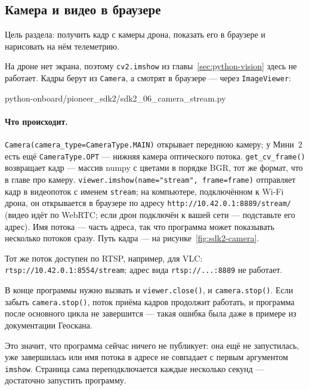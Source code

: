 \subsection{Камера и видео в браузере}

Цель раздела: получить кадр с камеры дрона, показать его в браузере и нарисовать на нём телеметрию.

На дроне нет экрана, поэтому \verb|cv2.imshow| из главы~\ref{sec:python-vision} здесь не работает. Кадры берут из \verb|Camera|, а смотрят в браузере --- через \verb|ImageViewer|:

\begin{codefile}[python]{python-onboard/pioneer_sdk2/sdk2_06_camera_stream.py}
\end{codefile}

\paragraph{Что происходит.} \verb|Camera(camera_type=CameraType.MAIN)| открывает переднюю камеру; у Мини~2 есть ещё \verb|CameraType.OPT| --- нижняя камера оптического потока. \verb|get_cv_frame()| возвращает кадр --- массив numpy с цветами в порядке BGR, тот же формат, что в главе про камеру. \verb|viewer.imshow(name="stream", frame=frame)| отправляет кадр в видеопоток с именем \texttt{stream}; на компьютере, подключённом к Wi-Fi дрона, он открывается в браузере по адресу \texttt{http://10.42.0.1:8889/stream/} (видео идёт по WebRTC; если дрон подключён к вашей сети --- подставьте его адрес). Имя потока --- часть адреса, так что программа может показывать несколько потоков сразу. Путь кадра --- на рисунке~\ref{fig:sdk2-camera}.

 Тот же поток доступен по RTSP, например, для VLC: \texttt{rtsp://10.42.0.1:8554/stream}; адрес вида \texttt{rtsp://...:8889} не работает.

\begin{warnbox}
В конце программы нужно вызвать и \verb|viewer.close()|, и \verb|camera.stop()|. Если забыть \verb|camera.stop()|, поток приёма кадров продолжит работать, и программа после основного цикла не завершится --- такая ошибка была даже в примере из документации Геоскана.
\end{warnbox}

\begin{warnbox}
Это значит, что программа сейчас ничего не публикует: она ещё не запустилась, уже завершилась или имя потока в адресе не совпадает с первым аргументом \verb|imshow|. Страница сама переподключается каждые несколько секунд --- достаточно запустить программу.
\end{warnbox}

